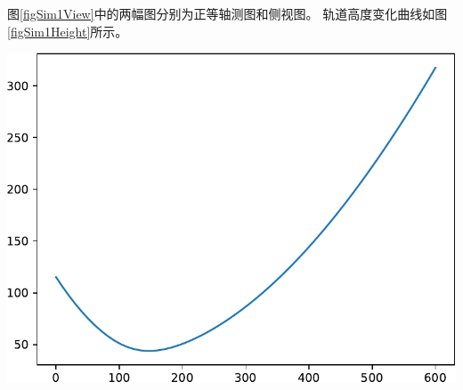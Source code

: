 图\ref{figSim1View}中的两幅图分别为正等轴测图和侧视图。
轨道高度变化曲线如图\ref{figSim1Height}所示。
\begin{center}
	\includegraphics[scale=0.6]{sim1Height.pdf} \\
	\label{figSim1Height}
\end{center}


